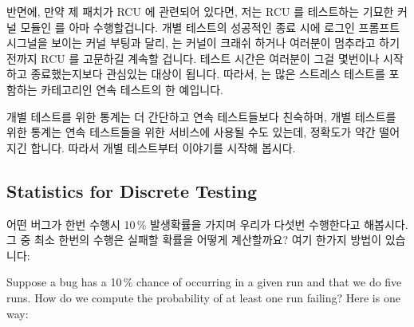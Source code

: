 \fi

반면에, 만약 제 패치가 RCU 에 관련되어 있다면, 저는 RCU 를 테스트하는 기묘한
커널 모듈인  를 아마 수행할겁니다.
개별 테스트의 성공적인 종료 시에 로그인 프롬프트 시그널을 보이는 커널 부팅과
달리,  는 커널이 크래쉬 하거나 여러분이 멈추라고 하기 전까지 RCU
를 고문하길 계속할 겁니다.
 테스트 시간은 여러분이 그걸 몇번이나 시작하고 종료했는지보다
관심있는 대상이 됩니다.
따라서,  는 많은 스트레스 테스트를 포함하는 카테고리인 연속
테스트의 한 예입니다.

개별 테스트를 위한 통계는 더 간단하고 연속 테스트들보다 친숙하며, 개별 테스트를
위한 통계는 연속 테스트들을 위한 서비스에 사용될 수도 있는데, 정확도가 약간
떨어지긴 합니다.
따라서 개별 테스트부터 이야기를 시작해 봅시다.

\subsection{Statistics for Discrete Testing}
\label{sec:debugging:Statistics for Discrete Testing}

어떤 버그가 한번 수행시 10\,\% 발생확률을 가지며 우리가 다섯번 수행한다고
해봅시다.
그 중 최소 한번의 수행은 실패할 확률을 어떻게 계산할까요?
여기 한가지 방법이 있습니다:

\iffalse

Suppose a bug has a 10\,\% chance of occurring in a given run and that
we do five runs.
How do we compute the probability of at least one run failing?
Here is one way:

